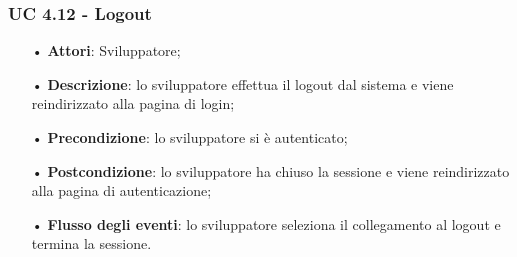 
\subsubsection{UC 4.12 - Logout}
\begin{itemize}
	\item[•]\textbf{Attori}: Sviluppatore;
	\item[•]\textbf{Descrizione}: lo sviluppatore effettua il logout dal sistema e viene reindirizzato alla pagina di login;
	\item[•]\textbf{Precondizione}: lo sviluppatore si è autenticato;
	\item[•]\textbf{Postcondizione}: lo sviluppatore ha chiuso la sessione e viene reindirizzato alla pagina di autenticazione; 
	\item[•]\textbf{Flusso degli eventi}: lo sviluppatore seleziona il collegamento al logout e termina la sessione.
\end{itemize}
